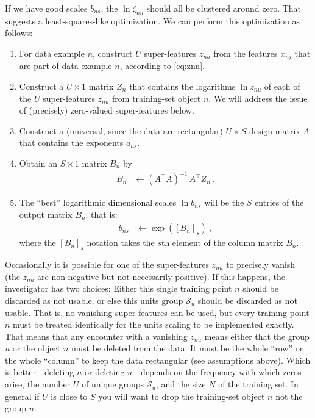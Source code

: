 \documentclass[12pt, letterpaper]{article}
\newcommand{\set}[1]{\mathcal{#1}}
\newcommand{\setS}{\set{S}}
\begin{document}
If we have good scales $b_{ns}$, the $\ln\zeta_{nu}$ should all be clustered around zero.
That suggests a least-squares-like optimization.
We can perform this optimization as follows:
\begin{enumerate}
  \item For data example $n$, construct $U$ super-features $z_{nu}$ from the features $x_{nj}$ that are part of data example $n$, according to \eqref{eq:znu}.
  \item Construct a $U\times 1$ matrix $Z_n$ that contains the logarithms $\ln z_{nu}$ of each of the $U$ super-features $z_{nu}$ from training-set object $n$.
We will address the issue of (precisely) zero-valued super-features below.
  \item Construct a (universal, since the data are rectangular) $U\times S$ design matrix $A$ that contains the exponents $a_{us}$.
  \item Obtain an $S\times 1$ matrix $B_n$ by
  \begin{align}\label{eq:Bn}
      B_n &\leftarrow (A^\top A)^{-1}\,A^\top Z_n ~.
  \end{align}
\item The ``best'' logarithmic dimensional scales $\ln b_{ns}$ will be the $S$ entries of the output matrix $B_n$; that is:
\begin{align}
    b_{ns} &\leftarrow \exp([B_n]_s) ~,
\end{align}
where the $[B_n]_s$ notation takes the $s$th element of the column matrix $B_n$.
\end{enumerate}

Occasionally it is possible for one of the super-features $z_{nu}$ to precisely vanish (the $z_{nu}$ are non-negative but not necessarily positive).
If this happens, the investigator has two choices:
Either this single training point $n$ should be discarded as not usable, or else this units group $\setS_u$ should be discarded as not usable.
That is, no vanishing super-features can be used, but every training point $n$ must be treated identically for the units scaling to be implemented exactly.
That means that any encounter with a vanishing $z_{nu}$ means either that the group $u$ or the object $n$ must be deleted from the data.
It must be the whole ``row'' or the whole ``column'' to keep the data rectangular (see assumptions above).
Which is better---deleting $n$ or deleting $u$---depends on the frequency with which zeros arise, the number $U$ of unique groups $\setS_u$, and the size $N$ of the training set. In general if $U$ is close to $S$ you will want to drop the training-set object $n$ not the group $u$.
\end{document}

